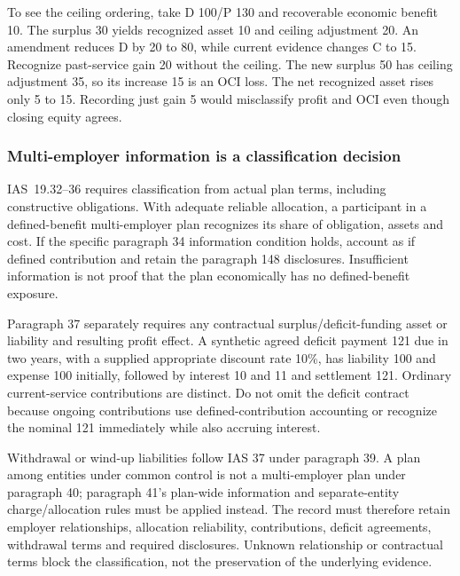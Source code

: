 To see the ceiling ordering, take D 100/P 130 and recoverable economic benefit 10. The surplus 30 yields recognized asset 10 and ceiling adjustment 20. An amendment reduces D by 20 to 80, while current evidence changes C to 15. Recognize past-service gain 20 without the ceiling. The new surplus 50 has ceiling adjustment 35, so its increase 15 is an OCI loss. The net recognized asset rises only 5 to 15. Recording just gain 5 would misclassify profit and OCI even though closing equity agrees.

\hypertarget{multi-employer-information-is-a-classification-decision}{%
\subsubsection{Multi-employer information is a classification decision}\label{multi-employer-information-is-a-classification-decision}}

IAS~19.32--36 \citep[IAS~19.32--41]{eu20231803} requires classification from actual plan terms, including constructive obligations. With adequate reliable allocation, a participant in a defined-benefit multi-employer plan recognizes its share of obligation, assets and cost. If the specific paragraph 34 information condition holds, account as if defined contribution and retain the paragraph 148 disclosures. Insufficient information is not proof that the plan economically has no defined-benefit exposure.

Paragraph 37 separately requires any contractual surplus/deficit-funding asset or liability and resulting profit effect. A synthetic agreed deficit payment 121 due in two years, with a supplied appropriate discount rate 10\%, has liability 100 and expense 100 initially, followed by interest 10 and 11 and settlement 121. Ordinary current-service contributions are distinct. Do not omit the deficit contract because ongoing contributions use defined-contribution accounting or recognize the nominal 121 immediately while also accruing interest.

Withdrawal or wind-up liabilities follow IAS 37 under paragraph 39. A plan among entities under common control is not a multi-employer plan under paragraph 40; paragraph 41's plan-wide information and separate-entity charge/allocation rules must be applied instead. The record must therefore retain employer relationships, allocation reliability, contributions, deficit agreements, withdrawal terms and required disclosures. Unknown relationship or contractual terms block the classification, not the preservation of the underlying evidence.
